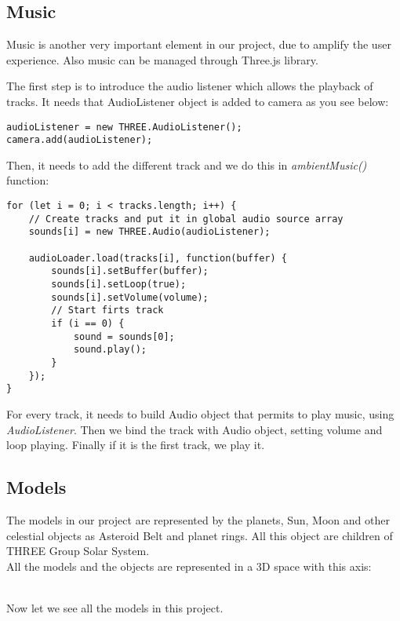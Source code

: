 \documentclass{article}
\begin{document}
\subsection{Music}\label{music:section}
Music is another very important element in our project, due to amplify the user experience. Also music can be managed through Three.js library.
\par The first step is to introduce the audio listener which allows the playback of tracks. It needs that AudioListener\cite{documentation:threejs} object is added to camera as you see below:
\begin{lstlisting}
audioListener = new THREE.AudioListener();
camera.add(audioListener);
\end{lstlisting}
\par Then, it needs to add the different track and we do this in \textit{ambientMusic()} function:
\begin{lstlisting}
for (let i = 0; i < tracks.length; i++) {
	// Create tracks and put it in global audio source array
	sounds[i] = new THREE.Audio(audioListener);
	
	audioLoader.load(tracks[i], function(buffer) {
		sounds[i].setBuffer(buffer);
		sounds[i].setLoop(true);
		sounds[i].setVolume(volume);
		// Start firts track
		if (i == 0) {
			sound = sounds[0];
			sound.play();
		}
	});
}
\end{lstlisting}
For every track, it needs to build Audio\cite{documentation:threejs} object that permits to play music, using \textit{AudioListener}. Then we bind the track with Audio object, setting volume and loop playing. Finally if it is the first track, we play it.


\subsection{Models}
The models in our project are represented by the planets, Sun, Moon and other celestial objects as Asteroid Belt and planet rings. All this object are children of THREE Group Solar System.\\
All the models and the objects are represented in a 3D space with this axis:
\\
\\
Now let we see all the models in this project.
\end{document}
